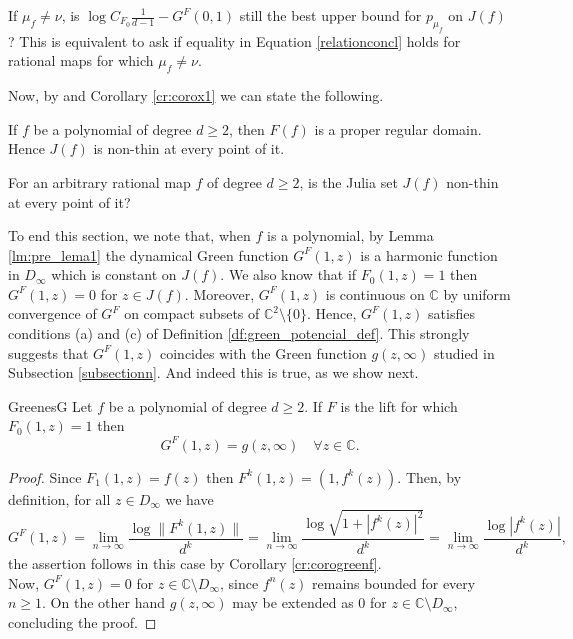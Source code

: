 \begin{myqstn}{}{}
If $\mu_f\neq \nu$, is $\log C_{F_0}\frac{1}{d-1}-G^F(0,1)$ still the best upper bound for $p_{\mu_f}$ on $J(f)$? This is equivalent to ask if equality in Equation \eqref{relationconcl} holds for rational maps for which $\mu_f\neq \nu$.\\
\end{myqstn}

Now, by \cite[Theorem 4.2.4]{ransford} and Corollary \ref{cr:corox1} we can state the following.

\begin{mycoro}{}{}
If $f$ be a polynomial of degree $d\geq 2$, then $F(f)$ is a proper regular domain. Hence $J(f)$ is non-thin at every point of it.
\end{mycoro}

\begin{myqstn}{}{}
For an arbitrary rational map $f$ of degree $d\geq 2$, is the Julia set $J(f)$ non-thin at every point of it?\\
\end{myqstn}

To end this section, we note that, when $f$ is a polynomial, by Lemma \ref{lm:pre_lema1} the dynamical Green function $G^F(1,z)$ is a harmonic function in $D_\infty$ which is constant on $J(f)$. We also know that if $F_0(1,z)=1$ then $G^F(1,z)=0$ for $z\in J(f)$. Moreover, $G^F(1,z)$ is continuous on $\mathbb{C}$ by uniform convergence of $G^F$ on compact subsets of $\mathbb{C}^2\setminus\{0 \}$. Hence, $G^F(1,z)$ satisfies conditions (a) and (c) of Definition \ref{df:green_potencial_def}. This strongly suggests that $G^F(1,z)$ coincides with the Green function $g(z,\infty)$ studied in Subsection \ref{subsectionn}. And indeed this is true, as we show next.\\

\begin{myprop}{}{GreenesG}
Let $f$ be a polynomial of degree $d\geq 2$. If $F$ is the lift for which $F_0(1,z)=1$ then 
$$G^F(1,z) = g(z,\infty) \quad \forall z\in \mathbb{C}.$$ 
\end{myprop}

\begin{proof}
Since $F_1(1,z) = f(z)$ then $F^k(1,z)=(1,f^k(z))$. Then, by definition, for all $z\in D_\infty$ we have
$$G^F(1,z) = \lim_{n\rightarrow \infty} \frac{\log\| F^k(1,z)\|}{d^k} = \lim_{n\rightarrow \infty} \frac{\log  \sqrt{1+|f^k(z)|^2}}{d^k} = \lim_{n\rightarrow \infty}\frac{\log|f^k(z)|}{d^k},$$
the assertion follows in this case by Corollary \ref{cr:corogreenf}.\\

Now, $G^F(1,z)=0$ for $z\in \mathbb{C}\setminus D_\infty$, since $f^n(z)$ remains bounded for every $n\geq 1$. On the other hand $g(z,\infty)$ may be extended as $0$ for $z\in \mathbb{C}\setminus D_\infty$, concluding the proof.
\end{proof}

